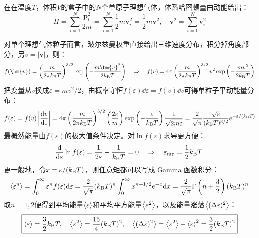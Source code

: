 \begin{proposition}[正则系综下的单原子理想气体]
在在温度$T$，体积$V$的盒子中的$N$个单原子理想气体，体系哈密顿量由动能给出：
\[H=\sum_{i=1}^{N}\frac{\bm{p}_i^2}{2m}=\sum_{i=1}^{N}\frac{1}{2}m\bm{v}_i^2=\frac{1}{2}m\bm{v}^2, \quad \bm{v}^2=\sum_{i=1}^{N}\bm{v}_i^2\]
\end{proposition}
对单个理想气体粒子而言，玻尔兹曼权重直接给出三维速度分布，积分掉角度部分，另$v=|\bm{v}|$，则：
\[f(\bm{v})=\left(\frac{m}{2\pi k_{\rm B} T}\right)^{3/2}\exp\left(-\frac{m\bm{v}^2}{2k_{\rm B} T}\right) \quad \Rightarrow \quad f(v)=4\pi \left(\frac{m}{2\pi k_{\rm B} T}\right)^{3/2}v^2\exp\left(-\frac{mv^2}{2k_{\rm B} T}\right)\]
把变量从$v$换成$\varepsilon=mv^2/2$，由概率守恒$f(\varepsilon)\dd\varepsilon=f(v)\dd v$可得单粒子平动能量分布：
\[f(\varepsilon)
=f(v)\left|\dv{v}{\varepsilon}\right|=4\pi \left(\frac{m}{2\pi k_{\rm B} T}\right)^{3/2}\left(\frac{2\varepsilon}{m}\right)\exp\left(-\frac{\varepsilon}{k_{\rm B} T}\right)\frac{1}{\sqrt{2m\varepsilon}}=\frac{2}{\sqrt{\pi}} \frac{\sqrt{\varepsilon}}{(k_{\rm B} T)^{3/2}}e^{-\varepsilon/(k_{\rm B} T)}\]
最概然能量由$f(\varepsilon)$的极大值条件决定。对$\ln f(\varepsilon)$求导更方便：
\[
\dv{}{\varepsilon}\ln f(\varepsilon)=\frac{1}{2\varepsilon}-\frac{1}{k_{\rm B} T}=0
\quad \Rightarrow \quad
\varepsilon_{\rm mp}=\frac{1}{2}k_{\rm B} T.
\]
更一般地，令$x=\varepsilon/(k_{\rm B}T)$，则任意矩都可以写成 Gamma 函数积分：
\[\expval{\varepsilon^n}=\int_0^\infty \varepsilon^n f(\varepsilon)\dd\varepsilon=\frac{2}{\sqrt{\pi}}(k_{\rm B} T)^n\int_0^\infty x^{n+1/2}e^{-x}\dd x=\frac{2}{\sqrt{\pi}}\Gamma\left(n+\frac{3}{2}\right)(k_{\rm B} T)^n\]
取$n=1,2$便得到平均能量$\expval{\varepsilon}$和平均平方能量$\expval{\varepsilon^2}$，以及能量涨落$\expval{(\Delta \varepsilon)^2}$：
\[\boxed{\expval{\varepsilon}=\frac{3}{2}k_{\rm B} T,\quad \expval{\varepsilon^2}=\frac{15}{4}(k_{\rm B} T)^2,\quad \expval{(\Delta \varepsilon)^2}=\expval{\varepsilon^2}-\expval{\varepsilon}^2=\frac{3}{2}(k_{\rm B} T)^2}\]

